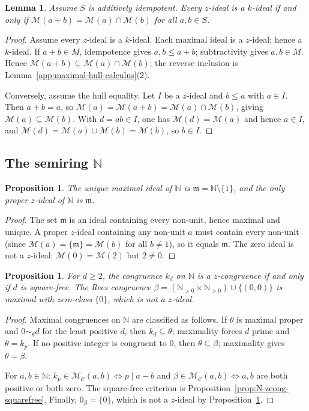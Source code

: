 \documentclass[11pt,leqno]{amsart}
\theoremstyle{plain}
\newtheorem{proposition}[theorem]{Proposition}
\newtheorem{lemma}[theorem]{Lemma}
\theoremstyle{definition}
\theoremstyle{remark}
\numberwithin{equation}{section}
\newcommand{\M}{\mathcal M}
\newcommand{\MC}{\mathcal M_{\mathcal C}}
\newcommand{\N}{\mathds N}
\begin{document}
\begin{lemma}\label{app:idempotent-sum-expanded}
Assume $S$ is additively idempotent.  Every $z$-ideal is a $k$-ideal
if and only if $\M(a+b)=\M(a)\cap\M(b)$ for all $a,b\in S$.
\end{lemma}
\begin{proof}
Assume every $z$-ideal is a $k$-ideal.
Each maximal ideal is a $z$-ideal; hence a $k$-ideal.
If $a+b\in M$, idempotence gives $a,b\leqslant a+b$;
subtractivity gives $a,b\in M$.
Hence $\M(a+b)\subseteq\M(a)\cap\M(b)$;
the reverse inclusion is Lemma~\ref{app:maximal-hull-calculus}(2).

Conversely, assume the hull equality.
Let $I$ be a $z$-ideal and $b\leqslant a$ with $a\in I$.
Then $a+b=a$, so $\M(a)=\M(a+b)=\M(a)\cap\M(b)$,
giving $\M(a)\subseteq\M(b)$.
With $d=ab\in I$, one has $\M(d)=\M(a)$ and hence $a\in I$,
and $\M(d)=\M(a)\cup\M(b)=\M(b)$, so $b\in I$.
\end{proof}

\subsection{The semiring \texorpdfstring{$\N$}{N}}

\begin{proposition}\label{app:N-z-ideal-expanded}
The unique maximal ideal of $\N$ is $\mathfrak{m}=\N\setminus\{1\}$,
and the only proper $z$-ideal of $\N$ is $\mathfrak{m}$.
\end{proposition}
\begin{proof}
The set $\mathfrak{m}$ is an ideal containing every non-unit,
hence maximal and unique.
A proper $z$-ideal containing any non-unit $a$ must contain every
non-unit (since $\M(a)=\{\mathfrak{m}\}=\M(b)$ for all $b\neq1$),
so it equals $\mathfrak{m}$.
The zero ideal is not a $z$-ideal: $\M(0)=\M(2)$ but $2\neq0$.
\end{proof}

\begin{proposition}\label{app:N-congruences-expanded}
For $d\geqslant2$, the congruence $k_d$ on $\N$ is a $z$-congruence
if and only if $d$ is square-free.  The Rees congruence
$\beta=(\N_{>0}\times\N_{>0})\cup\{(0,0)\}$ is maximal with
zero-class $\{0\}$, which is not a $z$-ideal.
\end{proposition}
\begin{proof}
Maximal congruences on $\N$ are classified as follows.
If $\theta$ is maximal proper and $0\sim_\theta d$ for the least
positive $d$, then $k_d\subseteq\theta$; maximality forces $d$ prime
and $\theta=k_p$.
If no positive integer is congruent to $0$, then $\theta\subseteq\beta$;
maximality gives $\theta=\beta$.

For $a,b\in\N$: $k_p\in\MC(a,b)\Leftrightarrow p\mid a-b$
and $\beta\in\MC(a,b)\Leftrightarrow a,b$ are both positive or
both zero.
The square-free criterion is Proposition~\ref{prop:N-zcong-squarefree}.
Finally, $0_\beta=\{0\}$, which is not a $z$-ideal by
Proposition~\ref{app:N-z-ideal-expanded}.
\end{proof}
\end{document}
